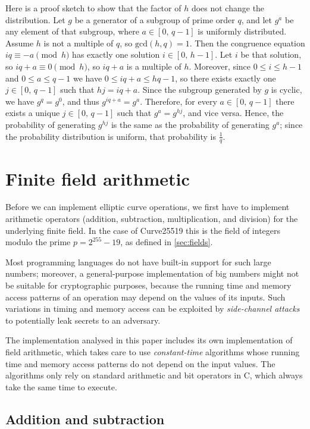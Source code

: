 \documentclass[manuscript]{acmart}
\begin{document}
Here is a proof sketch to show that the factor of $h$ does not change the distribution.
Let $g$ be a generator of a subgroup of prime order $q$, and let $g^a$ be any element of that subgroup, where $a \in [0,\, q-1]$ is uniformly distributed.
Assume $h$ is not a multiple of $q$, so $\mathrm{gcd}(h, q) = 1$.
Then the congruence equation $iq \equiv -a \pmod{h}$ has exactly one solution $i \in [0,\, h-1]$.
Let $i$ be that solution, so $iq + a \equiv 0 \pmod{h}$, so $iq + a$ is a multiple of $h$.
Moreover, since $0 \le i \le h-1$ and $0 \le a \le q-1$ we have $0 \le iq + a \le hq - 1$, so there exists exactly one $j \in [0,\, q-1]$ such that $hj = iq + a$.
Since the subgroup generated by $g$ is cyclic, we have $g^{q} = g^0$, and thus $g^{iq+a} = g^a$.
Therefore, for every $a \in [0,\, q-1]$ there exists a unique $j \in [0,\, q-1]$ such that $g^a = g^{hj}$, and vice versa.
Hence, the probability of generating $g^{hj}$ is the same as the probability of generating $g^a$; since the probability distribution is uniform, that probability is $\frac{1}{q}$.

\section{Finite field arithmetic}\label{sec:field-arithmetic}

Before we can implement elliptic curve operations, we first have to implement arithmetic operators (addition, subtraction, multiplication, and division) for the underlying finite field.
In the case of Curve25519 this is the field of integers modulo the prime $p = 2^{255} - 19$, as defined in \autoref{sec:fields}.

Most programming languages do not have built-in support for such large numbers; moreover, a general-purpose implementation of big numbers might not be suitable for cryptographic purposes, because the running time and memory access patterns of an operation may depend on the values of its inputs.
Such variations in timing and memory access can be exploited by \emph{side-channel attacks} to potentially leak secrets to an adversary.

The implementation analysed in this paper includes its own implementation of field arithmetic, which takes care to use \emph{constant-time} algorithms whose running time and memory access patterns do not depend on the input values.
The algorithms only rely on standard arithmetic and bit operators in C, which always take the same time to execute.

\subsection{Addition and subtraction}\label{sec:add-subtract}
\end{document}
